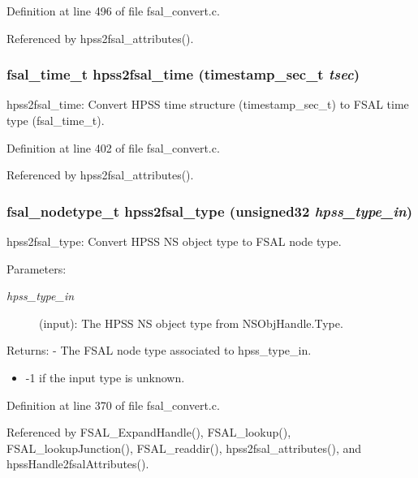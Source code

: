 Definition at line 496 of file fsal\_\-convert.c.

Referenced by hpss2fsal\_\-attributes().
\subsubsection{\setlength{\rightskip}{0pt plus 5cm}fsal\_\-time\_\-t hpss2fsal\_\-time (timestamp\_\-sec\_\-t {\em tsec})}\label{fsal__convert_8c_a8}


hpss2fsal\_\-time: Convert HPSS time structure (timestamp\_\-sec\_\-t) to FSAL time type (fsal\_\-time\_\-t). 

Definition at line 402 of file fsal\_\-convert.c.

Referenced by hpss2fsal\_\-attributes().
\subsubsection{\setlength{\rightskip}{0pt plus 5cm}fsal\_\-nodetype\_\-t hpss2fsal\_\-type (unsigned32 {\em hpss\_\-type\_\-in})}\label{fsal__convert_8c_a7}


hpss2fsal\_\-type: Convert HPSS NS object type to FSAL node type.

\begin{Desc}
\item[Parameters:]
\begin{description}
\item[{\em hpss\_\-type\_\-in}](input): The HPSS NS object type from NSObj\-Handle.Type.\end{description}
\end{Desc}
\begin{Desc}
\item[Returns:]- The FSAL node type associated to hpss\_\-type\_\-in.\begin{itemize}
\item -1 if the input type is unknown. \end{itemize}
\end{Desc}


Definition at line 370 of file fsal\_\-convert.c.

Referenced by FSAL\_\-Expand\-Handle(), FSAL\_\-lookup(), FSAL\_\-lookup\-Junction(), FSAL\_\-readdir(), hpss2fsal\_\-attributes(), and hpss\-Handle2fsal\-Attributes().
